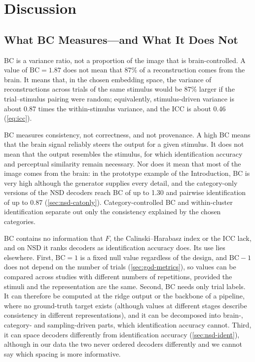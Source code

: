 \documentclass[11pt,a4paper]{article}
\begin{document}
\section{Discussion}
\label{sec:discussion}

\subsection{What BC Measures---and What It Does Not}

BC is a variance ratio, not a proportion of the image that is brain-controlled.
A value of $\mathrm{BC}=1.87$ does not mean that 87\% of a reconstruction comes
from the brain. It means that, in the chosen embedding space, the variance of
reconstructions across trials of the same stimulus would be 87\% larger if the
trial--stimulus pairing were random; equivalently, stimulus-driven variance is
about 0.87 times the within-stimulus variance, and the ICC is about 0.46
(\cref{eq:icc}).

BC measures consistency, not correctness, and not provenance. A high BC means
that the brain signal reliably steers the output for a given stimulus. It does
not mean that the output resembles the stimulus, for which identification
accuracy and perceptual similarity remain necessary. Nor does it mean that most
of the image comes from the brain: in the prototype example of the
Introduction, BC is very high although the generator supplies every detail, and
the category-only versions of the NSD decoders reach BC of up to 1.30 and
pairwise identification of up to 0.87 (\cref{sec:nsd-catonly}).
Category-controlled BC and within-cluster identification separate out only the
consistency explained by the chosen categories.

BC contains no information that $F$, the Calinski--Harabasz index or the ICC
lack, and on NSD it ranks decoders as identification accuracy does. Its use lies
elsewhere. First, $\mathrm{BC}=1$ is a fixed null value regardless of the
design, and $\mathrm{BC}-1$ does not depend on the number of trials
(\cref{sec:god-metrics}), so values can be compared across studies with
different numbers of repetitions, provided the stimuli and the representation
are the same. Second, BC needs only trial labels. It can
therefore be computed at the ridge output or the backbone of a pipeline, where
no ground-truth target exists (although values at different stages describe
consistency in different representations), and it can be decomposed into brain-, category-
and sampling-driven parts, which identification accuracy cannot. Third, it can
space decoders differently from identification accuracy (\cref{sec:nsd-ident}),
although in our data the two never ordered decoders differently and we cannot
say which spacing is more informative.
\end{document}
